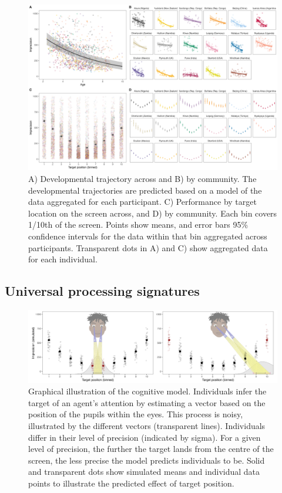 \documentclass[
  man,floatsintext]{apa6}
\begin{document}
\begin{figure}

{\centering \includegraphics[width=1\linewidth]{../figures/pvis_pred} 

}

\caption{A) Developmental trajectory across and B) by community. The developmental trajectories are predicted based on a model of the data aggregated for each participant. C) Performance by target location on the screen across, and D) by community. Each bin covers 1/10th of the screen. Points show means, and error bars 95\% confidence intervals for the data within that bin aggregated across participants. Transparent dots in A) and C) show aggregated data for each individual.}\label{fig:fig2}
\end{figure}

\hypertarget{universal-processing-signatures}{%
\subsection{Universal processing signatures}\label{universal-processing-signatures}}

\begin{figure}

{\centering \includegraphics[width=1\linewidth]{../figures/fig1_3} 

}

\caption{Graphical illustration of the cognitive model. Individuals infer the target of an agent’s attention by estimating a vector based on the position of the pupils within the eyes. This process is noisy, illustrated by the different vectors (transparent lines). Individuals differ in their level of precision (indicated by sigma). For a given level of precision, the further the target lands from the centre of the screen, the less precise the model predicts individuals to be. Solid and transparent dots show simulated means and individual data points to illustrate the predicted effect of target position.}\label{fig:fig12}
\end{figure}
\end{document}
